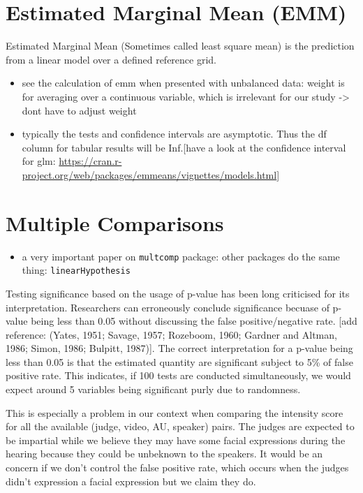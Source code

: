 \documentclass{monashthesis}
\begin{document}
\hypertarget{estimated-marginal-mean-emm}{%
\section{Estimated Marginal Mean (EMM)}\label{estimated-marginal-mean-emm}}

Estimated Marginal Mean (Sometimes called least square mean) is the prediction from a linear model over a defined reference grid.

\begin{itemize}
\item
  see the calculation of emm when presented with unbalanced data: weight is for averaging over a continuous variable, which is irrelevant for our study -\textgreater{} dont have to adjust weight
\item
  typically the tests and confidence intervals are asymptotic. Thus the df column for tabular results will be Inf.{[}have a look at the confidence interval for glm: \url{https://cran.r-project.org/web/packages/emmeans/vignettes/models.html}{]}
\end{itemize}

\hypertarget{multiple-comparisons}{%
\section{Multiple Comparisons}\label{multiple-comparisons}}

\begin{itemize}
\tightlist
\item
  a very important paper on \texttt{multcomp} package: \textcite{hothorn2008simultaneous}
  other packages do the same thing: \texttt{linearHypothesis}
\end{itemize}

Testing significance based on the usage of p-value has been long criticised for its interpretation. Researchers can erroneously conclude significance becuase of p-value being less than 0.05 without discussing the false positive/negative rate. {[}add reference: (Yates, 1951; Savage, 1957; Rozeboom, 1960; Gardner and Altman, 1986; Simon, 1986; Bulpitt, 1987){]}. The correct interpretation for a p-value being less than 0.05 is that the estimated quantity are significant subject to 5\% of false positive rate. This indicates,
if 100 tests are conducted simultaneously, we would expect around 5 variables being significant purly due to randomness.

This is especially a problem in our context when comparing the intensity score for all the available (judge, video, AU, speaker) pairs. The judges are expected to be impartial while we believe they may have some facial expressions during the hearing because they could be unbeknown to the speakers. It would be an concern if we don't control the false positive rate, which occurs when the judges didn't expression a facial expression but we claim they do.
\end{document}
